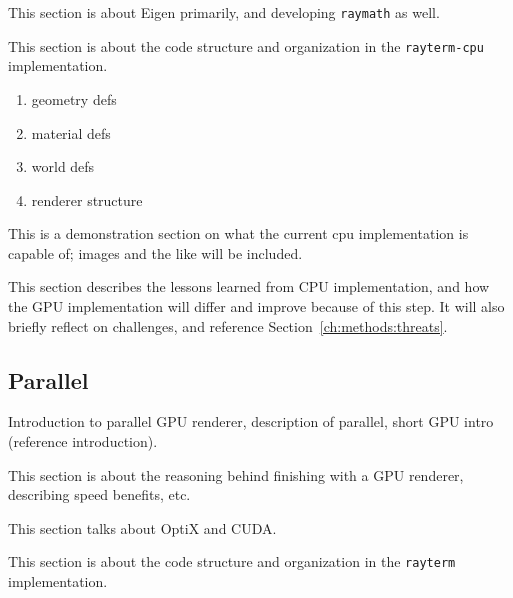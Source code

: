 This section is about Eigen primarily, and developing \texttt{raymath} as well.

 \label{ch:methods:renderer:sequential:design}

This section is about the code structure and organization in the \texttt{rayterm-cpu} implementation.

\begin{enumerate}
  \item geometry defs
  \item material defs
  \item world defs
  \item renderer structure
\end{enumerate}

 \label{ch:methods:renderer:sequential:proto}

This is a demonstration section on what the current cpu implementation is capable of; images and the like will be included.

 \label{ch:methods:renderer:sequential:takeaway}

This section describes the lessons learned from CPU implementation, and how the GPU implementation will differ and improve because of this step. It will also briefly reflect on challenges, and reference Section~\ref{ch:methods:threats}.

\subsection{Parallel} \label{ch:methods:renderer:parallel}

Introduction to parallel GPU renderer, description of parallel, short GPU intro (reference introduction).

 \label{ch:methods:renderer:parallel:motivation}

This section is about the reasoning behind finishing with a GPU renderer, describing speed benefits, etc.

 \label{ch:methods:renderer:parallel:libraries}

This section talks about OptiX and CUDA.

 \label{ch:methods:renderer:parallel:design}

This section is about the code structure and organization in the \texttt{rayterm} implementation.

